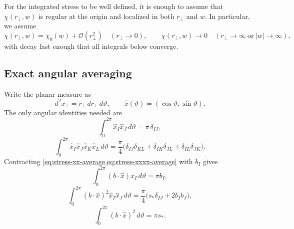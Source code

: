 \documentclass[11pt]{article}
\theoremstyle{plain}
\theoremstyle{definition}
\theoremstyle{remark}
\newcommand{\Order}[1]{\mathcal{O}\!\left(#1\right)}
\begin{document}
For the integrated stress to be well defined, it is enough to assume that \(\chi(r_\perp,w)\) is regular at the origin and localized in both \(r_\perp\) and \(w\). In particular, we assume
\begin{equation}
\chi(r_\perp,w)=\chi_0(w)+\Order{r_\perp^2}
\quad (r_\perp\to 0),
\qquad
\chi(r_\perp,w)\to 0
\quad (r_\perp\to\infty\ \text{or}\ |w|\to\infty),
\label{eq:stress-regularity}
\end{equation}
with decay fast enough that all integrals below converge.

\subsection{Exact angular averaging}\label{subsec:stress-angular-average}

Write the planar measure as
\begin{equation}
d^2x_\perp = r_\perp\,dr_\perp\,d\vartheta,
\qquad
\hat x(\vartheta)=(\cos\vartheta,\sin\vartheta).
\label{eq:stress-planar-measure}
\end{equation}
The only angular identities needed are
\begin{equation}
\int_0^{2\pi}\hat x_I\hat x_J\,d\vartheta = \pi\,\delta_{IJ},
\label{eq:stress-xx-average}
\end{equation}
\begin{equation}
\int_0^{2\pi}\hat x_I\hat x_J\hat x_K\hat x_L\,d\vartheta
=
\frac{\pi}{4}
\bigl(
\delta_{IJ}\delta_{KL}+\delta_{IK}\delta_{JL}+\delta_{IL}\delta_{JK}
\bigr).
\label{eq:stress-xxxx-average}
\end{equation}
Contracting \cref{eq:stress-xx-average,eq:stress-xxxx-average} with \(b_I\) gives
\begin{equation}
\int_0^{2\pi}(b\!\cdot\!\hat x)\hat x_I\,d\vartheta = \pi b_I,
\label{eq:stress-bxhat-average}
\end{equation}
\begin{equation}
\int_0^{2\pi}(b\!\cdot\!\hat x)^2\hat x_I\hat x_J\,d\vartheta
=
\frac{\pi}{4}\bigl(s_*\delta_{IJ}+2b_Ib_J\bigr),
\label{eq:stress-bxhat2-average}
\end{equation}
\begin{equation}
\int_0^{2\pi}(b\!\cdot\!\hat x)^2\,d\vartheta = \pi s_*.
\label{eq:stress-bxhat2-scalar}
\end{equation}
\end{document}
